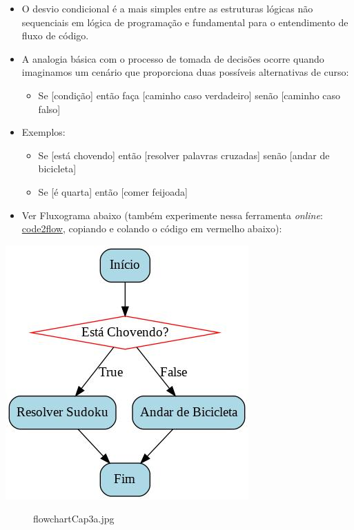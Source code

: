 \documentclass[12pt,a4paper]{article}
\providecommand{\tightlist}{%
      \setlength{\itemsep}{0pt}\setlength{\parskip}{0pt}}
\begin{document}
    \begin{itemize}
\item
  O desvio condicional é a mais simples entre as estruturas lógicas não
  sequenciais em lógica de programação e fundamental para o entendimento
  de fluxo de código.
\item
  A analogia básica com o processo de tomada de decisões ocorre quando
  imaginamos um cenário que proporciona duas possíveis alternativas de
  curso:

  \begin{itemize}
  \tightlist
  \item
    Se {[}condição{]} então faça {[}caminho caso verdadeiro{]} senão
    {[}caminho caso falso{]}
  \end{itemize}
\item
  Exemplos:

  \begin{itemize}
  \tightlist
  \item
    Se {[}está chovendo{]} então {[}resolver palavras cruzadas{]} senão
    {[}andar de bicicleta{]}
  \item
    Se {[}é quarta{]} então {[}comer feijoada{]}
  \end{itemize}
\item
  Ver Fluxograma abaixo (também experimente nessa ferramenta
  \emph{online}: \href{https://app.code2flow.com/}{code2flow}, copiando
  e colando o código em vermelho abaixo):
\end{itemize}

\includegraphics{"figs/flowchartCap3a.jpg"}

    \begin{figure}
\centering
\caption{flowchartCap3a.jpg}
\end{figure}
\end{document}
